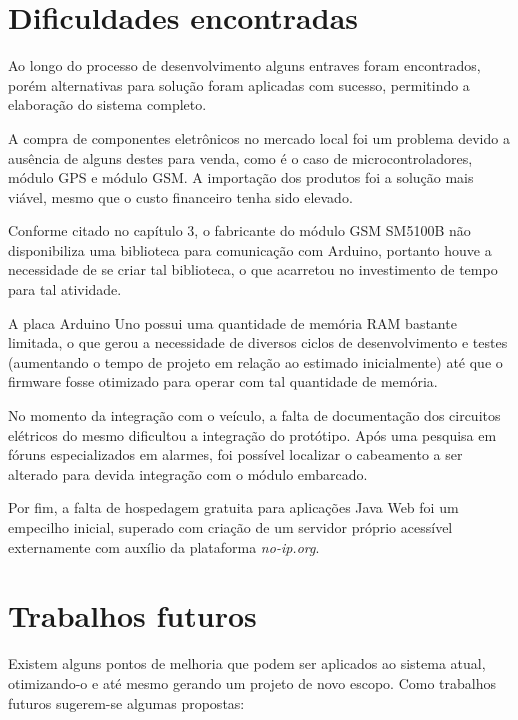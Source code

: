 \section{Dificuldades encontradas}

Ao longo do processo de desenvolvimento alguns entraves foram encontrados, porém alternativas para solução foram aplicadas com sucesso, permitindo a elaboração do sistema completo.

A compra de componentes eletrônicos no mercado local foi um problema devido a ausência de alguns destes para venda, como é o caso de microcontroladores, módulo GPS e módulo GSM. A importação dos produtos foi a solução mais viável, mesmo que o custo financeiro tenha sido elevado.

Conforme citado no capítulo 3, o fabricante do módulo GSM SM5100B não disponibiliza uma biblioteca para comunicação com Arduino, portanto houve a necessidade de se criar tal biblioteca, o que acarretou no investimento de tempo para tal atividade.

A placa Arduino Uno possui uma quantidade de memória RAM bastante limitada, o que gerou a necessidade de diversos ciclos de desenvolvimento e testes (aumentando o tempo de projeto em relação ao estimado inicialmente) até que o firmware fosse otimizado para operar com tal quantidade de memória.

No momento da integração com o veículo, a falta de documentação dos circuitos elétricos do mesmo dificultou a integração do protótipo. Após uma pesquisa em fóruns especializados em alarmes, foi possível localizar o cabeamento a ser alterado para devida integração com o módulo embarcado.

Por fim, a falta de hospedagem gratuita para aplicações Java Web foi um empecilho inicial, superado com criação de um servidor próprio acessível externamente com auxílio da plataforma \textit{no-ip.org}.

\section{Trabalhos futuros}

Existem alguns pontos de melhoria que podem ser aplicados ao sistema atual, otimizando-o e até mesmo gerando um projeto de novo escopo. Como trabalhos futuros sugerem-se algumas propostas:


